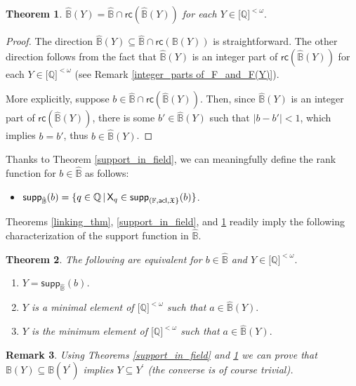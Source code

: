 \documentclass{amsart}
\newtheorem{theorem}{Theorem}[section]
\newtheorem{rem}[theorem]{Remark}
\begin{document}
\begin{theorem} \label{B(Y) in rc(B(Y))} $\hat{\mathbb{B}}(Y)=\hat{\mathbb{B}}\cap \mathsf{rc}(\hat{\mathbb{B}}(Y))$ for each $Y\in \lbrack \mathbb{Q}]^{<\omega }.$
\end{theorem}

\begin{proof} The direction $\hat{\mathbb{B}}(Y)\subseteq \hat{\mathbb{B}}%
\cap \mathsf{rc}(\mathbb{B}(Y))$ is straightforward. The other direction follows from the 
fact that $\hat{\mathbb{B}}(Y)$ is an integer part of $\mathsf{rc}(\hat{\mathbb{B}}(Y))$ for 
each $Y\in \lbrack \mathbb{Q}]^{<\omega}$ (see Remark \ref{integer_parts of_F_and_F(Y)}).

More explicitly, suppose $b\in \hat{\mathbb{B}}\cap \mathsf{rc}(\hat{\mathbb{B}}(Y))$. 
Then, since $\hat{\mathbb{B}}(Y)$ is an integer part of $\mathsf{rc}(\hat{\mathbb{B}}(Y))$, 
there is some $b' \in \hat{\mathbb{B}}(Y)$ such that $\left\vert b-b'\right\vert <1$,
which implies $b=b'$, thus $b\in \hat{\mathbb{B}}(Y)$.
\end{proof}

Thanks to Theorem \ref{support_in_field}, we can meaningfully define the rank function for 
$b\in \hat{\mathbb{B}}$ as follows:
\begin{itemize}
\item   $\mathsf{supp}_{
\hat{\mathbb{B}}}(b)=\{q\in \mathbb{Q}\mathop\mid\mathsf{X}_{q}\in \mathsf{supp}_{(\mathbb{F},
\mathsf{acl},\frak{X}\}}(b)\}$.
\end{itemize}
Theorems \ref{linking_thm}, \ref{support_in_field}, and  \ref{B(Y) in rc(B(Y))} readily imply the following characterization of the support function in $\hat{\mathbb{B}}$.


\begin{theorem} \label{properties_of_B-support}The following are equivalent for $b\in \hat{\mathbb{B}}$ and $Y\in
\lbrack \mathbb{Q}]^{<\omega }.$
\begin{enumerate}[$1$.]
\item $Y=\mathsf{supp}_{\hat{\mathbb{B}}}(b)$.
\item   $Y$ is a minimal element of 
$\lbrack \mathbb{Q}]^{<\omega }$ such that $a\in \hat{\mathbb{B}}%
(Y).$

\item   $Y$ is the minimum element of 
$\lbrack \mathbb{Q}]^{<\omega }$ such that $a\in \hat{\mathbb{B}}%
(Y).$

\end{enumerate}
\end{theorem}
\begin{rem} \label{B(Y) is monotone}Using Theorems \ref{support_in_field} and \ref{B(Y) in rc(B(Y))} we can prove that $\mathbb{B}(Y)\subseteq \mathbb{B}(Y^{\prime })$
implies $Y\subseteq Y^{\prime }$ \textup(the converse is of course trivial\textup).  
\end{rem}
\end{document}
